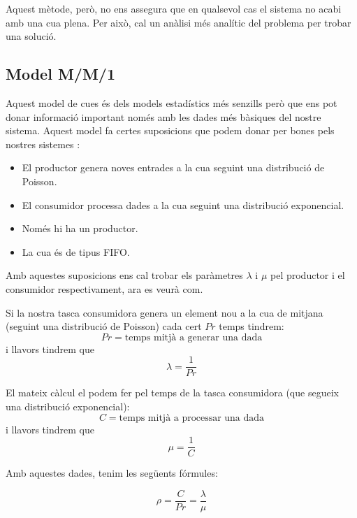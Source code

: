 Aquest mètode, però, no ens assegura que en qualsevol cas el sistema no acabi amb una cua plena. Per això, cal un anàlisi més analític del problema per trobar una solució.

\subsection{Model M/M/1}
\label{sub:mm1}

Aquest model de cues és dels models estadístics més senzills però que ens pot donar informació important només amb les dades més bàsiques del nostre sistema. Aquest model fa certes suposicions que podem donar per bones pels nostres sistemes \cite{mm1_1}\cite{mm1_2}\cite{mm1_3}\cite{mm1_4}:
\begin{itemize}
 \item El productor genera noves entrades a la cua seguint una distribució de Poisson.
 \item El consumidor processa dades a la cua seguint una distribució exponencial.
 \item Només hi ha un productor.
 \item La cua és de tipus FIFO.
\end{itemize}

Amb aquestes suposicions ens cal trobar els paràmetres $\lambda$ i $\mu$ pel productor i el consumidor respectivament, ara es veurà com.

Si la nostra tasca consumidora genera un element nou a la cua de mitjana (seguint una distribució de Poisson) cada cert $Pr$ temps tindrem:
\begin{equation}
 Pr = \text {temps mitjà a generar una dada}
\end{equation}
i llavors tindrem que
\begin{equation}
 \lambda = \frac{1}{Pr}
\end{equation}

El mateix càlcul el podem fer pel temps de la tasca consumidora (que segueix una distribució exponencial):
\begin{equation}
C = \text {temps mitjà a processar una dada}
\end{equation}
i llavors tindrem que
\begin{equation}
 \mu = \frac{1}{C}
\end{equation}

Amb aquestes dades, tenim les següents fórmules:

\begin{equation}
 \rho = \frac{C}{Pr} = \frac{\lambda}{\mu}
\end{equation}

